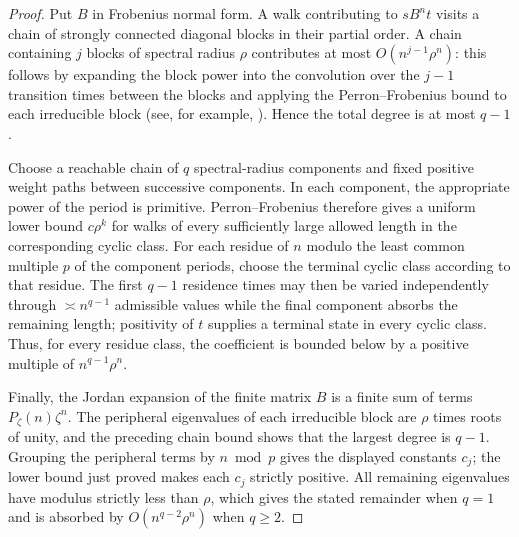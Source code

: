 \begin{proof}
Put $B$ in Frobenius normal form.  A walk contributing to $sB^nt$ visits a
chain of strongly connected diagonal blocks in their partial order.  A chain
containing $j$ blocks of spectral radius $\rho$ contributes at most
$O(n^{j-1}\rho^n)$: this follows by expanding the block power into the
convolution over the $j-1$ transition times between the blocks and applying
the Perron--Frobenius bound to each irreducible block (see, for example,
\cite[Chs.~1--2]{Seneta2006}).  Hence the total degree is at most $q-1$.

Choose a reachable chain of $q$ spectral-radius components and fixed positive
weight paths between successive components.  In each component, the
appropriate power of the period is primitive.  Perron--Frobenius therefore
gives a uniform lower bound $c\rho^k$ for walks of every sufficiently large
allowed length in the corresponding cyclic class.  For each residue of $n$
modulo the least common multiple $p$ of the component periods, choose the
terminal cyclic class according to that residue.  The first $q-1$ residence
times may then be varied independently through $\asymp n^{q-1}$ admissible
values while the final component absorbs the remaining length; positivity of
$t$ supplies a terminal state in every cyclic class.  Thus, for every residue
class, the coefficient is bounded below by a positive multiple of
$n^{q-1}\rho^n$.

Finally, the Jordan expansion of the finite matrix $B$ is a finite sum of terms
$P_\zeta(n)\zeta^n$.  The peripheral eigenvalues of each irreducible block are
$\rho$ times roots of unity, and the preceding chain bound shows that the
largest degree is $q-1$.  Grouping the peripheral terms by $n\bmod p$ gives
the displayed constants $c_j$; the lower bound just proved makes each
$c_j$ strictly positive.  All remaining eigenvalues have modulus strictly
less than $\rho$, which gives the stated remainder when $q=1$ and is absorbed
by $O(n^{q-2}\rho^n)$ when $q\ge2$.
\end{proof}

